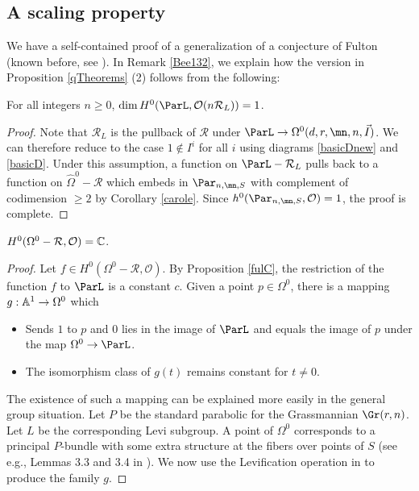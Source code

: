  \subsection{A scaling property}\label{FSP}
We have a self-contained proof of a generalization of a conjecture of Fulton (known before, see \cite[Remark 8.5]{BKq}). In Remark \ref{Bee132}, we explain how the version in Proposition \ref{qTheorems} (2) follows from the following:
\begin{proposition}
\notready\label{fulC} For all integers $n\geq 0$,
$\dim H^0(\ParL,\mathcal{O}(n\mathcal{R}_L))=1$.
\end{proposition}
\begin{proof}
 Note that $\mathcal{R}_L$ is the pullback of $\mathcal{R}$ under $\ParL\to {\Omega}^0(d,r,\mn,n,\vec{I})$. We can therefore reduce to the case  $1\not\in I^i$ for all $i$ using diagrams \eqref{basicDnew} and \eqref{basicD}.
Under this assumption, a function on $\ParL-\mathcal{R}_L$ pulls back to a function on $\widehat{\Omega}^0-\mathcal{R}$ which embeds in $\Par_{n,\mn,S}$ with complement of codimension $\geq 2$ by Corollary \ref{carole}. Since $h^0(\Par_{n,\mn,S},\mathcal{O})=1$, the proof is complete.
\end{proof}
\begin{proposition}
\notready\label{rigid}
$H^0(\Omega^0-\mathcal{R},\mathcal{O})=\Bbb{C}$.
\end{proposition}
\begin{proof}
Let $f\in H^0(\Omega^0-\mathcal{R},\mathcal{O})$. By Proposition \ref{fulC}, the restriction of the function $f$ to $\ParL$ is a constant $c$. Given a point $p\in \Omega^0$, there is a mapping $g:\Bbb{A}^1\to \Omega^0$ which
\begin{itemize}
\item[-] Sends $1$ to $p$ and $0$ lies in the image of $\ParL$ and equals the image of $p$ under the map $\Omega^0\to \ParL$.
\item[-] The isomorphism class of $g(t)$ remains constant for $t\neq 0$.
\end{itemize}
The existence of such a mapping can be explained more easily in the general group situation. Let $P$ be the standard parabolic for the Grassmannian $\Gr(r,n)$. Let $L$ be the corresponding Levi subgroup. A point of $\Omega^0$ corresponds to a principal $P$-bundle with some extra structure at the fibers over points of $S$ (see e.g., Lemmas 3.3 and 3.4 in \cite{BKiers}). We now use the Levification operation in  \cite[Section 3.8]{BKq} to produce the family $g$.
\end{proof}
